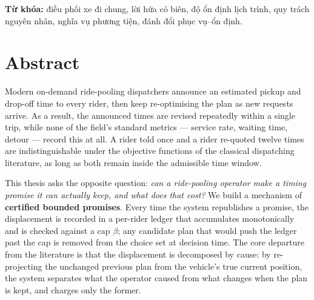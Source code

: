 \vspace{6pt}
\noindent\textbf{Từ khóa:} điều phối xe đi chung, lời hứa có biên, độ ổn định lịch trình,
quy trách nguyên nhân, nghĩa vụ phương tiện, đánh đổi phục vụ--ổn định.

\clearpage

\chapter*{Abstract}

Modern on-demand ride-pooling dispatchers announce an estimated pickup and drop-off time to
every rider, then keep re-optimising the plan as new requests arrive. As a result, the
announced times are revised repeatedly within a single trip, while none of the field's
standard metrics --- service rate, waiting time, detour --- record this at all. A rider told
once and a rider re-quoted twelve times are indistinguishable under the objective functions of
the classical dispatching literature, as long as both remain inside the admissible time window.

This thesis asks the opposite question: \emph{can a ride-pooling operator make a timing
promise it can actually keep, and what does that cost?} We build a mechanism of
\textbf{certified bounded promises}. Every time the system republishes a promise, the
displacement is recorded in a per-rider ledger that accumulates monotonically and is checked
against a cap $\beta$; any candidate plan that would push the ledger past the cap is removed
from the choice set at decision time. The core departure from the literature is that the
displacement is decomposed by cause: by re-projecting the unchanged previous plan from the
vehicle's true current position, the system separates what the operator caused from what
changes when the plan is kept, and charges only the former.

